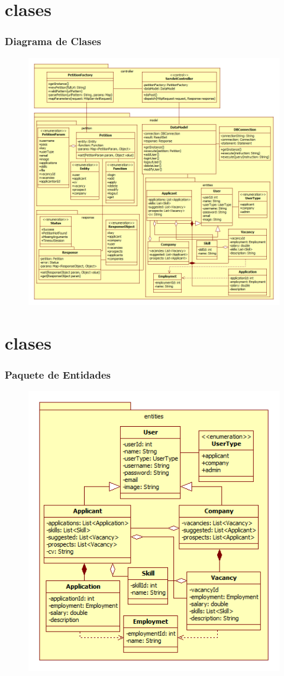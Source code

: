 \section{clases}
\frame
{
  \frametitle{Diagrama de Clases}
  
	\begin{figure}[h]
	\begin{center}
	 	\includegraphics[scale=0.30]{./resources/ClassDiagram.png} 
	\end{center}
	\end{figure}
}
\section{clases}
\frame
{
  \frametitle{Paquete de Entidades}
  
	\begin{figure}[h]
	\begin{center}
	 	\includegraphics[scale=0.45]{./resources/EntitiesPackage.png} 
	\end{center}
	\end{figure}
}